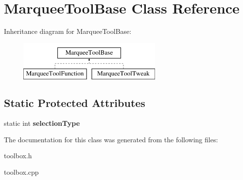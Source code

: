 \hypertarget{class_marquee_tool_base}{\section{Marquee\-Tool\-Base Class Reference}
\label{class_marquee_tool_base}
}
Inheritance diagram for Marquee\-Tool\-Base\-:\begin{figure}[H]
\begin{center}
\leavevmode
\includegraphics[height=2.000000cm]{class_marquee_tool_base}
\end{center}
\end{figure}
\subsection*{Static Protected Attributes}
\begin{DoxyCompactItemize}
\item 
\hypertarget{class_marquee_tool_base_aa174a70654de721265893e1dbe0863ca}{static int {\bfseries selection\-Type}}\label{class_marquee_tool_base_aa174a70654de721265893e1dbe0863ca}

\end{DoxyCompactItemize}


The documentation for this class was generated from the following files\-:\begin{DoxyCompactItemize}
\item 
toolbox.\-h\item 
toolbox.\-cpp\end{DoxyCompactItemize}
